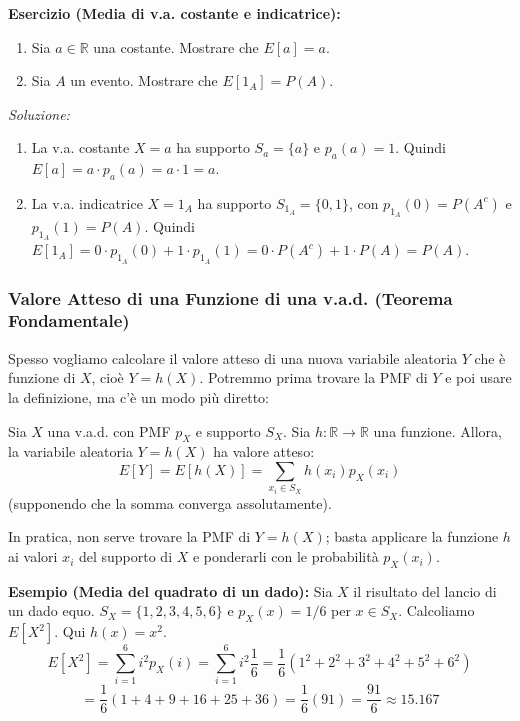 \begin{example}
\textbf{Esercizio (Media di v.a. costante e indicatrice):}
\begin{enumerate}
    \item Sia $a \in \mathbb{R}$ una costante. Mostrare che $E[a] = a$.
    \item Sia $A$ un evento. Mostrare che $E[1_A] = P(A)$.
\end{enumerate}
\textit{Soluzione:}
\begin{enumerate}
    \item La v.a. costante $X=a$ ha supporto $S_a=\{a\}$ e $p_a(a)=1$.
    Quindi $E[a] = a \cdot p_a(a) = a \cdot 1 = a$.
    \item La v.a. indicatrice $X=1_A$ ha supporto $S_{1_A}=\{0,1\}$, con $p_{1_A}(0)=P(A^c)$ e $p_{1_A}(1)=P(A)$.
    Quindi $E[1_A] = 0 \cdot p_{1_A}(0) + 1 \cdot p_{1_A}(1) = 0 \cdot P(A^c) + 1 \cdot P(A) = P(A)$.
\end{enumerate}
\end{example}

\subsubsection{Valore Atteso di una Funzione di una v.a.d. (Teorema Fondamentale)}
Spesso vogliamo calcolare il valore atteso di una nuova variabile aleatoria $Y$ che è funzione di $X$, cioè $Y=h(X)$. Potremmo prima trovare la PMF di $Y$ e poi usare la definizione, ma c'è un modo più diretto:

\begin{theorem}
Sia $X$ una v.a.d. con PMF $p_X$ e supporto $S_X$. Sia $h: \mathbb{R} \to \mathbb{R}$ una funzione. Allora, la variabile aleatoria $Y=h(X)$ ha valore atteso:
\[ E[Y] = E[h(X)] = \sum_{x_i \in S_X} h(x_i) p_X(x_i) \]
(supponendo che la somma converga assolutamente).
\end{theorem}
In pratica, non serve trovare la PMF di $Y=h(X)$; basta applicare la funzione $h$ ai valori $x_i$ del supporto di $X$ e ponderarli con le probabilità $p_X(x_i)$.

\begin{example}
\textbf{Esempio (Media del quadrato di un dado):}
Sia $X$ il risultato del lancio di un dado equo. $S_X=\{1,2,3,4,5,6\}$ e $p_X(x)=1/6$ per $x \in S_X$.
Calcoliamo $E[X^2]$. Qui $h(x)=x^2$.
\[ E[X^2] = \sum_{i=1}^6 i^2 p_X(i) = \sum_{i=1}^6 i^2 \frac{1}{6} = \frac{1}{6} (1^2+2^2+3^2+4^2+5^2+6^2) \]
\[ = \frac{1}{6} (1+4+9+16+25+36) = \frac{1}{6} (91) = \frac{91}{6} \approx 15.167 \]
\end{example}

